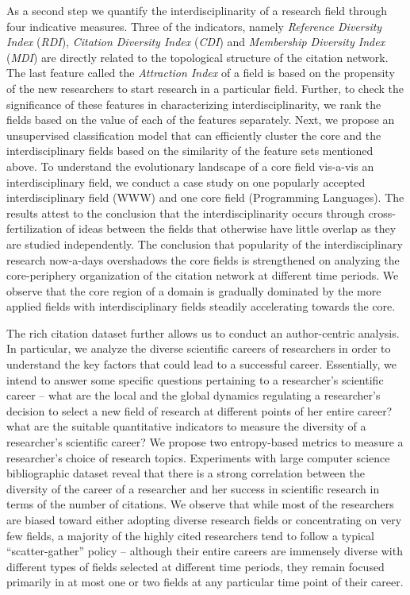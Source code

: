 As a second step we quantify the interdisciplinarity of a research field through four indicative
measures. Three of the indicators, namely {\em Reference Diversity Index} ({\em RDI}), {\em Citation Diversity Index} ({\em CDI}) and
{\em Membership Diversity Index} ({\em MDI}) are directly related to the topological structure of the citation network. The last feature
called the {\em Attraction Index} of a field is based on the propensity of the new researchers to start research in a particular field.
Further, to check the significance of these features in characterizing interdisciplinarity, we rank the fields based on the value of each of
the features separately. Next, we propose an unsupervised classification model  that can efficiently cluster the core and the
interdisciplinary fields based on the similarity of the feature sets mentioned above. To understand the evolutionary
landscape of a core field vis-a-vis an interdisciplinary field, we conduct a case study on one popularly accepted interdisciplinary field
(WWW) and one core
field (Programming Languages). The results attest to
the conclusion that the interdisciplinarity occurs through cross-fertilization of ideas between the fields that otherwise have little
overlap as they are studied independently.  The conclusion that popularity of the interdisciplinary research now-a-days overshadows the
core fields is strengthened on analyzing the core-periphery organization of the citation network at different time periods. We observe that
the core region of a domain is gradually dominated by the more applied fields with interdisciplinary fields steadily accelerating towards
the core. 

The rich citation dataset further allows us to conduct an author-centric analysis. In particular, we analyze the diverse scientific careers
of researchers in order to understand the key factors that could lead to a successful career. Essentially, we intend to answer some specific
questions pertaining to a researcher's scientific career -- what are the local and the global dynamics regulating a researcher's decision to
select a new field of research at different points of her entire career? what are the suitable quantitative indicators to measure the
diversity of a researcher's scientific career? We propose two entropy-based metrics to measure a researcher's choice of research topics.
Experiments with large computer science bibliographic dataset reveal that there is a strong correlation between the diversity of the career
of a researcher and her success in scientific research in terms of the number of citations. We observe that while most of the researchers
are biased toward either adopting diverse research fields or concentrating on very few fields, a majority of the highly cited researchers
tend
to follow a typical ``scatter-gather'' policy -- although their entire careers are immensely diverse with different types of fields
selected at different time periods, they remain focused primarily in at most one or two fields at any particular time point of their career.
 

